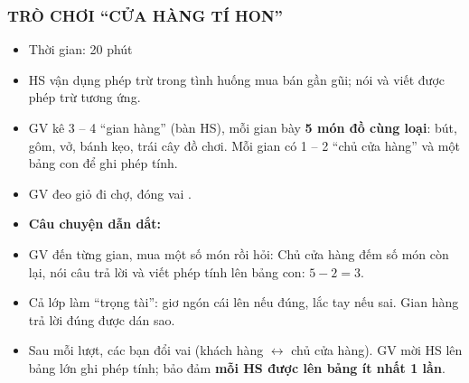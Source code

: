 \documentclass[../main.tex]{subfiles}
\begin{document}
\subsubsection{TRÒ CHƠI “CỬA HÀNG TÍ HON”}
\begin{hd}
    \begin{itemize}
        \item Thời gian: 20 phút
        \item HS vận dụng phép trừ trong tình huống mua bán gần gũi; nói và viết được phép trừ tương ứng.
    \end{itemize}
\end{hd}
\begin{itemize}
    \item GV kê 3 -- 4 “gian hàng” (bàn HS), mỗi gian bày \textbf{5 món đồ cùng loại}: bút, gôm, vở, bánh kẹo, trái cây đồ chơi. Mỗi gian có 1 -- 2 “chủ cửa hàng” và một bảng con để ghi phép tính.
    \item GV đeo giỏ đi chợ, đóng vai .
\end{itemize}
\begin{itemize}
    \item \textbf{Câu chuyện dẫn dắt:} 
    \item GV đến từng gian, mua một số món rồi hỏi:  Chủ cửa hàng đếm số món còn lại, nói câu trả lời và viết phép tính lên bảng con: $5 - 2 = 3$.
    \item Cả lớp làm “trọng tài”: giơ ngón cái lên nếu đúng, lắc tay nếu sai. Gian hàng trả lời đúng được dán sao.
    \item Sau mỗi lượt, các bạn đổi vai (khách hàng $\leftrightarrow$ chủ cửa hàng). GV mời HS lên bảng lớn ghi phép tính; bảo đảm \textbf{mỗi HS được lên bảng ít nhất 1 lần}.
\end{itemize}
\GAhinh
\end{document}
